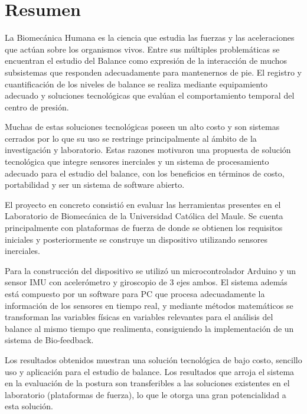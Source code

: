 \documentclass[12pt,a4paper]{article}
\begin{document}
\section*{Resumen}
La Biomecánica Humana es la ciencia que estudia las fuerzas y las aceleraciones que actúan sobre los organismos vivos. Entre sus múltiples problemáticas se encuentran el estudio del Balance como expresión de la interacción de muchos subsistemas que responden adecuadamente para mantenernos de pie. El registro y cuantificación de los niveles de balance se realiza mediante equipamiento adecuado y soluciones tecnológicas que evalúan el comportamiento temporal del centro de presión.

Muchas de estas soluciones tecnológicas poseen un alto costo y son sistemas cerrados por lo que su uso se restringe principalmente al ámbito de la investigación y laboratorio. Estas razones motivaron una propuesta de solución tecnológica que integre sensores inerciales y un sistema de procesamiento adecuado para el estudio del balance, con los beneficios en términos de costo, portabilidad y ser un sistema de software abierto.

El proyecto en concreto consistió en evaluar las herramientas presentes en el Laboratorio de Biomecánica de la Universidad Católica del Maule. Se cuenta principalmente con plataformas de fuerza de donde se obtienen los requisitos iniciales y posteriormente se construye un dispositivo utilizando sensores inerciales.

Para la construcción del dispositivo se utilizó un microcontrolador Arduino y un sensor IMU con acelerómetro y giroscopio de 3 ejes ambos. El sistema además está compuesto por un software para PC que procesa adecuadamente la información de los sensores en tiempo real, y mediante métodos matemáticos se transforman las variables físicas en variables relevantes para el análisis del balance al mismo tiempo que realimenta, consiguiendo la implementación de un sistema de Bio-feedback.

Los resultados obtenidos muestran una solución tecnológica de bajo costo, sencillo uso y aplicación para el estudio de balance. Los resultados que arroja el sistema en la evaluación de la postura son transferibles a las soluciones existentes en el laboratorio (plataformas de fuerza), lo que le otorga una gran potencialidad a esta solución.

\newpage

\cleardoublepage
{}
\tableofcontents
\cleardoublepage
{}
\thispagestyle{empty}
\listoffigures
\thispagestyle{empty}
\newpage
\listoftables
\thispagestyle{empty}
\pagebreak
\end{document}
